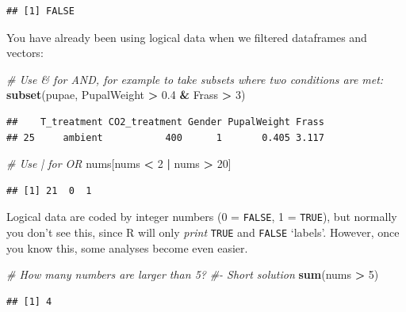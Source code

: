 \documentclass[]{book}
\newenvironment{Shaded}{\begin{snugshade}}{\end{snugshade}}
\newcommand{\CommentTok}[1]{\textcolor[rgb]{0.56,0.35,0.01}{\textit{#1}}}
\newcommand{\DecValTok}[1]{\textcolor[rgb]{0.00,0.00,0.81}{#1}}
\newcommand{\FloatTok}[1]{\textcolor[rgb]{0.00,0.00,0.81}{#1}}
\newcommand{\KeywordTok}[1]{\textcolor[rgb]{0.13,0.29,0.53}{\textbf{#1}}}
\newcommand{\NormalTok}[1]{#1}
\newcommand{\OperatorTok}[1]{\textcolor[rgb]{0.81,0.36,0.00}{\textbf{#1}}}
\newcommand{\StringTok}[1]{\textcolor[rgb]{0.31,0.60,0.02}{#1}}
\begin{document}
\begin{verbatim}
## [1] FALSE
\end{verbatim}

You have already been using logical data when we filtered dataframes and vectors:

\begin{Shaded}
\begin{Highlighting}[]
\CommentTok{# Use & for AND, for example to take subsets where two conditions are met:}
\KeywordTok{subset}\NormalTok{(pupae, PupalWeight }\OperatorTok{>}\StringTok{ }\FloatTok{0.4} \OperatorTok{&}\StringTok{ }\NormalTok{Frass }\OperatorTok{>}\StringTok{ }\DecValTok{3}\NormalTok{)}
\end{Highlighting}
\end{Shaded}

\begin{verbatim}
##    T_treatment CO2_treatment Gender PupalWeight Frass
## 25     ambient           400      1       0.405 3.117
\end{verbatim}

\begin{Shaded}
\begin{Highlighting}[]
\CommentTok{# Use | for OR}
\NormalTok{nums[nums }\OperatorTok{<}\StringTok{ }\DecValTok{2} \OperatorTok{|}\StringTok{ }\NormalTok{nums }\OperatorTok{>}\StringTok{ }\DecValTok{20}\NormalTok{]}
\end{Highlighting}
\end{Shaded}

\begin{verbatim}
## [1] 21  0  1
\end{verbatim}

Logical data are coded by integer numbers (0 = \texttt{FALSE}, 1 = \texttt{TRUE}), but normally you don't see this, since R will only \emph{print} \texttt{TRUE} and \texttt{FALSE} `labels'. However, once you know this, some analyses become even easier.

\begin{Shaded}
\begin{Highlighting}[]
\CommentTok{# How many numbers are larger than 5?}
\CommentTok{#- Short solution}
\KeywordTok{sum}\NormalTok{(nums }\OperatorTok{>}\StringTok{ }\DecValTok{5}\NormalTok{)}
\end{Highlighting}
\end{Shaded}

\begin{verbatim}
## [1] 4
\end{verbatim}
\end{document}
